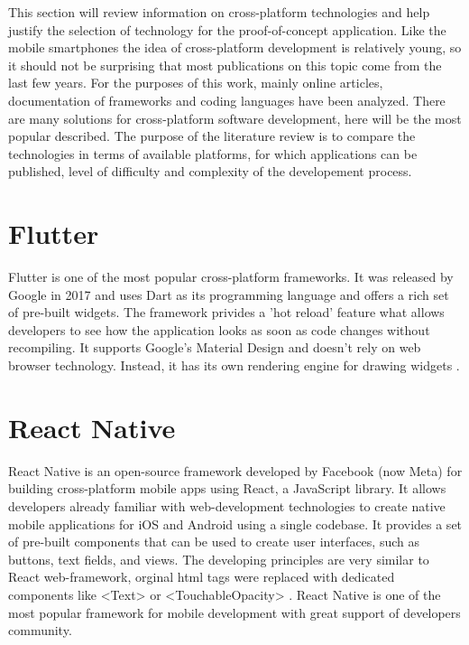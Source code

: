This section will review information on cross-platform technologies and help justify the selection of technology for the proof-of-concept application. Like the mobile smartphones the idea of cross-platform development is relatively young, so it should not be surprising that most publications on this topic come from the last few years. For the purposes of this work, mainly online articles, documentation of frameworks and coding languages have been analyzed. There are many solutions for cross-platform software development, here will be the most popular described. The purpose of the literature review is to compare the technologies in terms of available platforms, for which applications can be published, level of difficulty and complexity of the developement process.


\section{{Flutter}}%
\label{sec:flutter}

Flutter is one of the most popular cross-platform frameworks. It was released by Google in 2017 and uses Dart as its programming language and offers a rich set of pre-built widgets.
The framework privides a 'hot reload' feature what allows developers to see how the application looks as soon as code changes without recompiling. It supports Google's Material Design and doesn't rely on web browser technology. Instead, it has its own rendering engine for drawing widgets \autocite{FlutterDoc}.

\section{{React Native}}%
\label{sec:reactnative}

React Native is an open-source framework developed by Facebook (now Meta) for building cross-platform mobile apps using React, a JavaScript library. It allows developers already familiar with  web-development technologies to create native mobile applications for iOS and Android using a single codebase. It provides a set of pre-built components that can be used to create user interfaces, such as buttons, text fields, and views. The developing principles are very similar to React web-framework, orginal html tags were replaced with dedicated components like <Text> or <TouchableOpacity> \autocite{ReactNative}. React Native is one of the most popular framework for mobile development with great support of developers community.

